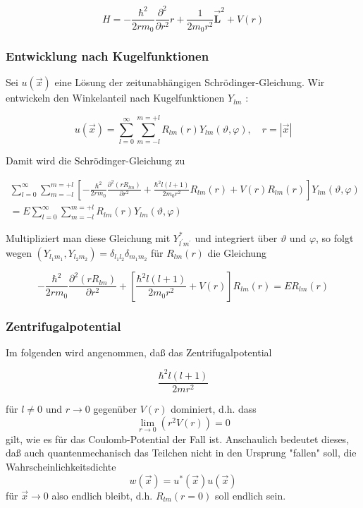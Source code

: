 \documentclass[10pt, letterpaper]{article}
\begin{document}
$$
H=-\frac{\hbar^{2}}{2 r m_{0}} \frac{\partial^{2}}{\partial r^{2}} r+\frac{1}{2 m_{0} r^{2}} \overrightarrow{\mathbf{L}}^{2}+V(r)
$$

\subsubsection*{Entwicklung nach Kugelfunktionen}
Sei $u(\vec{x})$ eine Lösung der zeitunabhängigen Schrödinger-Gleichung. Wir entwickeln den Winkelanteil nach Kugelfunktionen $Y_{l m}$ :

$$
u(\vec{x})=\sum_{l=0}^{\infty} \sum_{m=-l}^{m=+l} R_{l m}(r) Y_{l m}(\vartheta, \varphi), \quad r=|\vec{x}|
$$

Damit wird die Schrödinger-Gleichung zu

$$
\begin{array}{r}
\sum_{l=0}^{\infty} \sum_{m=-l}^{m=+l}\left[-\frac{\hbar^{2}}{2 r m_{0}} \frac{\partial^{2}\left(r R_{l m}\right)}{\partial r^{2}}+\frac{\hbar^{2} l(l+1)}{2 m_{0} r^{2}} R_{l m}(r)+V(r) R_{l m}(r)\right] Y_{l m}(\vartheta, \varphi) \\
=E \sum_{l=0}^{\infty} \sum_{m=-l}^{m=+l} R_{l m}(r) Y_{l m}(\vartheta, \varphi)
\end{array}
$$

Multipliziert man diese Gleichung mit $Y_{l^{\prime} m^{\prime}}^{*}$ und integriert über $\vartheta$ und $\varphi$, so folgt wegen $\left(Y_{l_{1} m_{1}}, Y_{l_{2} m_{2}}\right)=\delta_{l_{1} l_{2}} \delta_{m_{1} m_{2}}$ für $R_{l m}(r)$ die Gleichung

$$
-\frac{\hbar^{2}}{2 r m_{0}} \frac{\partial^{2}\left(r R_{l m}\right)}{\partial r^{2}}+\left[\frac{\hbar^{2} l(l+1)}{2 m_{0} r^{2}}+V(r)\right] R_{l m}(r)=E R_{l m}(r)
$$

\subsubsection*{Zentrifugalpotential}
Im folgenden wird angenommen, daß das Zentrifugalpotential

$$
\frac{\hbar^{2} l(l+1)}{2 m r^{2}}
$$

für $l \neq 0$ und $r \rightarrow 0$ gegenüber $V(r)$ dominiert, d.h. dass
$$
\lim _{r \rightarrow 0}\left(r^{2} V(r)\right)=0
$$
gilt, wie es für das Coulomb-Potential der Fall ist. Anschaulich bedeutet dieses, daß auch quantenmechanisch das Teilchen nicht in den Ursprung "fallen" soll, die Wahrscheinlichkeitsdichte
$$
w(\vec{x})=u^{*}(\vec{x}) u(\vec{x})
$$
für $\vec{x} \rightarrow 0$ also endlich bleibt, d.h. $R_{l m}(r=0)$ soll endlich sein.
\end{document}
